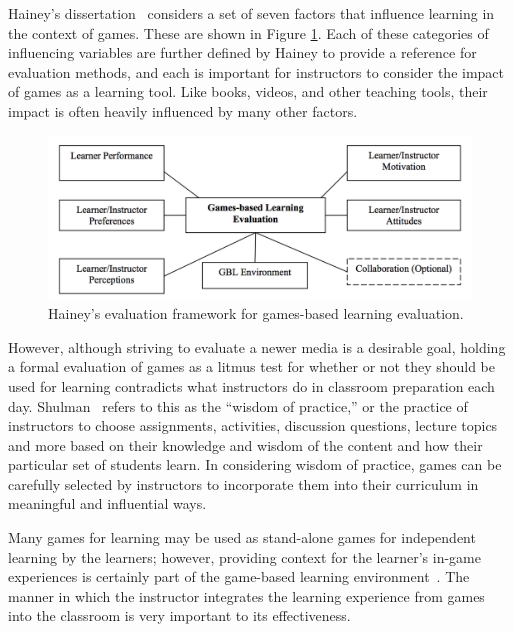 \documentclass{sig-alternate-05-2015}
\begin{document}
Hainey's dissertation~\cite{hainey2010using} considers a set of seven factors that influence learning in the context of games. These are shown in Figure \ref{figure:haineyframework}. Each of these categories of influencing variables are further defined by Hainey to provide a reference for evaluation methods, and each is important for instructors to consider the impact of games as a learning tool. Like books, videos, and other teaching tools, their impact is often heavily influenced by many other factors. 





\begin{figure}[tb]
\centering
\includegraphics[width=\linewidth]{images/image07.png}
\caption{Hainey's evaluation framework for games-based learning evaluation.}
\label{figure:haineyframework}
\end{figure}
 

 

However, although striving to evaluate a newer media is a desirable goal, holding a formal evaluation of games as a litmus test for whether or not they should be used for learning contradicts what instructors do in classroom preparation each day. Shulman~\cite{shulman86those} refers to this as the ``wisdom of practice,'' or the practice of instructors to choose assignments, activities, discussion questions, lecture topics and more based on their knowledge and wisdom of the content and how their particular set of students learn. In considering wisdom of practice, games can be carefully selected by instructors to incorporate them into their curriculum in meaningful and influential ways.



Many games for learning may be used as stand-alone games for independent learning by the learners; however, providing context for the learner's in-game experiences is certainly part of the game-based learning environment~\cite{oneil05classification}. The manner in which the instructor integrates the learning experience from games into the classroom is very important to its effectiveness. 
\end{document}
